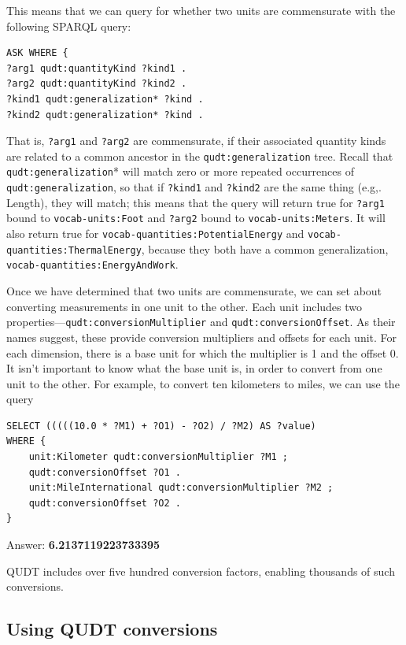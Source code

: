 This means that we can query for whether two units are commensurate with
the following SPARQL
query:

\begin{lstlisting}
ASK WHERE {
?arg1 qudt:quantityKind ?kind1 .
?arg2 qudt:quantityKind ?kind2 .
?kind1 qudt:generalization* ?kind .
?kind2 qudt:generalization* ?kind .
\end{lstlisting}

That is, \texttt{?arg1} and \texttt{?arg2} are commensurate, if their associated quantity
kinds are related to a common ancestor in the \texttt{qudt:generalization} tree.
Recall that \texttt{qudt:generalization}* will match zero or more repeated
occurrences of \texttt{qudt:generalization}, so that if \texttt{?kind1} and \texttt{?kind2} are the
same thing (e.g,. Length), they will match; this means that the query
will return true for \texttt{?arg1} bound to \texttt{vocab-units:Foot} and \texttt{?arg2} bound to
\texttt{vocab-units:Meters}. It will also return true for
\texttt{vocab-quantities:PotentialEnergy} and \texttt{vocab-quantities:ThermalEnergy},
because they both have a common generalization,
\texttt{vocab-quantities:EnergyAndWork}.

Once we have determined that two units are commensurate, we can set
about converting measurements in one unit to the other. Each unit
includes two properties---\texttt{qudt:conversionMultiplier} and
\texttt{qudt:conversionOffset}. As their names suggest, these provide conversion
multipliers and offsets for each unit. For each dimension, there is a
base unit for which the multiplier is 1 and the offset 0. It isn't
important to know what the base unit is, in order to convert from one
unit to the other. For example, to convert ten kilometers to miles, we
can use the query

\begin{lstlisting}
SELECT (((((10.0 * ?M1) + ?O1) - ?O2) / ?M2) AS ?value)
WHERE {
    unit:Kilometer qudt:conversionMultiplier ?M1 ;
    qudt:conversionOffset ?O1 .
    unit:MileInternational qudt:conversionMultiplier ?M2 ;
    qudt:conversionOffset ?O2 .
}
\end{lstlisting}

Answer: \textbf{6.2137119223733395}

QUDT includes over five hundred conversion factors, enabling thousands
of such conversions.

\subsection{Using QUDT conversions}

